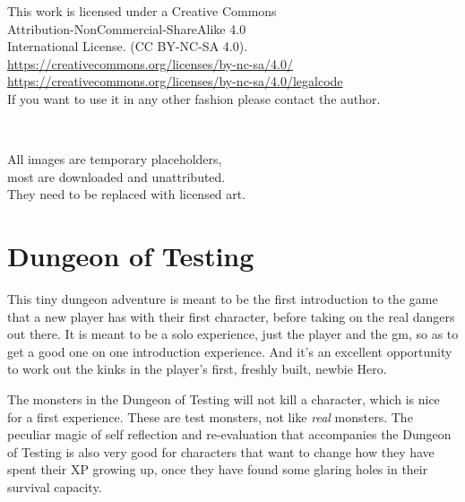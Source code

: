 \vsmall
\noindent
This work is licensed under a Creative Commons \\
Attribution-NonCommercial-ShareAlike 4.0 \\
International License. (CC BY-NC-SA 4.0).\\
\url{https://creativecommons.org/licenses/by-nc-sa/4.0/} \\
\url{https://creativecommons.org/licenses/by-nc-sa/4.0/legalcode} \\
If you want to use it in any other fashion please contact the author.

\

\noindent
All images are temporary placeholders, \\
most are downloaded and unattributed.\\
They need to be replaced with licensed art.

\normalsize






\cleardoublepage
\pagestyle{fancy}
\raggedbottom




\section*{Dungeon of Testing}

This tiny dungeon adventure is meant to be the first introduction to the game that a new player has with their first character, before taking on the real dangers out there. It is meant to be a solo experience, just the player and the gm, so as to get a good one on one introduction experience. And it's an excellent opportunity to work out the kinks in the player's first, freshly built, newbie Hero.

The monsters in the Dungeon of Testing will not kill a character, which is nice for a first experience. These are test monsters, not like \emph{real} monsters. The peculiar magic of self reflection and re-evaluation that accompanies the Dungeon of Testing is also very good for characters that want to change how they have spent their XP growing up, once they have found some glaring holes in their survival capacity.

